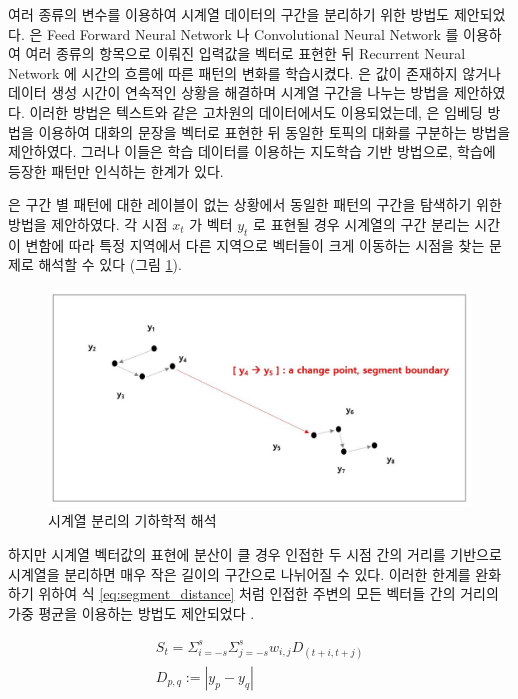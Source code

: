 \documentclass[oneside, ko,phd]{snuthesis_utf8_kor}
\begin{document}
여러 종류의 변수를 이용하여 시계열 데이터의 구간을 분리하기 위한 방법도 제안되었다.
\cite{karim2018multivariate, yao2017deepsense} 은 Feed Forward Neural Network 나 Convolutional Neural Network 를 이용하여 여러 종류의 항목으로 이뤄진 입력값을 벡터로 표현한 뒤 Recurrent Neural Network 에 시간의 흐름에 따른 패턴의 변화를 학습시켰다.
\cite{che2018recurrent} 은 값이 존재하지 않거나 데이터 생성 시간이 연속적인 상황을 해결하며 시계열 구간을 나누는 방법을 제안하였다.
이러한 방법은 텍스트와 같은 고차원의 데이터에서도 이용되었는데, \cite{kim2016exploring} 은 임베딩 방법을 이용하여 대화의 문장을 벡터로 표현한 뒤 동일한 토픽의 대화를 구분하는 방법을 제안하였다.
그러나 이들은 학습 데이터를 이용하는 지도학습 기반 방법으로, 학습에 등장한 패턴만 인식하는 한계가 있다.

\cite{kim2019representation} 은 구간 별 패턴에 대한 레이블이 없는 상황에서 동일한 패턴의 구간을 탐색하기 위한 방법을 제안하였다.
각 시점 $x_t$ 가 벡터 $y_t$ 로 표현될 경우 시계열의 구간 분리는 시간이 변함에 따라 특정 지역에서 다른 지역으로 벡터들이 크게 이동하는 시점을 찾는 문제로 해석할 수 있다 (그림 \ref{fig:timeseries_geometric_interpretation_of_segmentation}).

\begin{figure}[H]
\centering
\includegraphics[keepaspectratio=true, width=0.7\linewidth]{fig/timeseries_geometric_interpretation_of_segmentation.jpg}
\caption{시계열 분리의 기하학적 해석}
\label{fig:timeseries_geometric_interpretation_of_segmentation}
\end{figure}

하지만 시계열 벡터값의 표현에 분산이 클 경우 인접한 두 시점 간의 거리를 기반으로 시계열을 분리하면 매우 작은 길이의 구간으로 나뉘어질 수 있다.
이러한 한계를 완화하기 위하여 식 \ref{eq:segment_distance} 처럼 인접한 주변의 모든 벡터들 간의 거리의 가중 평균을 이용하는 방법도 제안되었다 \cite{foote2000automatic}.

\begin{equation}
\begin{split}
S_t = \Sigma_{i=-s}^{s} \Sigma_{j=-s}^{s} w_{i,j} D_{(t+i,t+j)} \\
D_{p,q} := |y_p - y_q|
\end{split}
\label{eq:segment_distance}
\end{equation}
\end{document}
